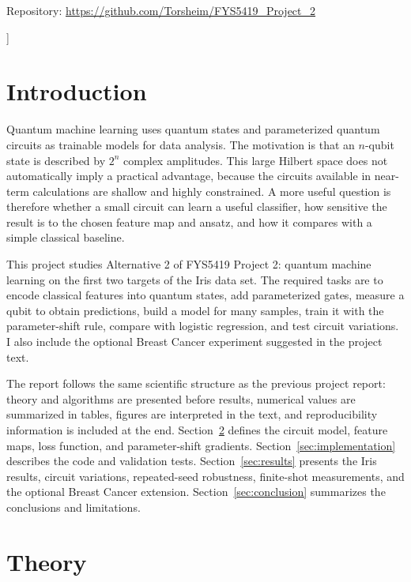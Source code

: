 \documentclass[10pt,a4paper]{article}
\begin{document}
\vspace{0.25cm}
\begin{center}
Repository: \url{https://github.com/Torsheim/FYS5419_Project_2}
\end{center}
\vspace{0.45cm}
]

\section{Introduction}
Quantum machine learning uses quantum states and parameterized quantum circuits as trainable models for data analysis. The motivation is that an \(n\)-qubit state is described by \(2^n\) complex amplitudes. This large Hilbert space does not automatically imply a practical advantage, because the circuits available in near-term calculations are shallow and highly constrained. A more useful question is therefore whether a small circuit can learn a useful classifier, how sensitive the result is to the chosen feature map and ansatz, and how it compares with a simple classical baseline.

This project studies Alternative 2 of FYS5419 Project 2: quantum machine learning on the first two targets of the Iris data set. The required tasks are to encode classical features into quantum states, add parameterized gates, measure a qubit to obtain predictions, build a model for many samples, train it with the parameter-shift rule, compare with logistic regression, and test circuit variations. I also include the optional Breast Cancer experiment suggested in the project text.

The report follows the same scientific structure as the previous project report: theory and algorithms are presented before results, numerical values are summarized in tables, figures are interpreted in the text, and reproducibility information is included at the end. Section~\ref{sec:theory} defines the circuit model, feature maps, loss function, and parameter-shift gradients. Section~\ref{sec:implementation} describes the code and validation tests. Section~\ref{sec:results} presents the Iris results, circuit variations, repeated-seed robustness, finite-shot measurements, and the optional Breast Cancer extension. Section~\ref{sec:conclusion} summarizes the conclusions and limitations.

\section{Theory}\label{sec:theory}
\end{document}
